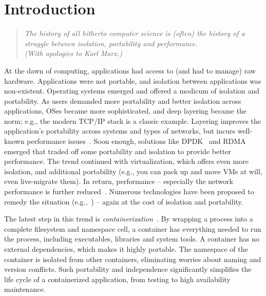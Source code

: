 \section{Introduction} 
\label{sec:introduction}

\begin{quote}
{\em 
The history of all hitherto computer science is (often) the history of a
struggle between isolation, portability and performance. \\ 
(With apologies to Karl Marx.)}
\end{quote}

At the dawn of computing, applications had access to (and had to manage) raw
hardware. Applications were not portable, and isolation between applications was
non-existent. Operating systems emerged and offered a modicum of isolation and
portability.  As users demanded more portability and better isolation across
applications, OSes became more sophisticated, and deep layering became the norm;
e.g., the modern TCP/IP stack is a classic example.  Layering improves the
application's portability across systems and types of  networks, but incurs
well-known performance issues~\cite{dcqcn,netmap}. Soon enough, solutions
like DPDK~\cite{dpdk} and RDMA~\cite{rdma} emerged that traded off some
portability and isolation to provide better performance.  The trend continued
with virtualization, which offers even more isolation, and additional
portability (e.g., you can pack up and move VMs at will, even live-migrate
them). In return, performance -- especially the network performance is further
reduced~\cite{netvm}. Numerous technologies have been proposed to remedy the
situation (e.g.,~\cite{sriov,netvm,netmap,dpdk}) -- again at the cost of
isolation and portability.

The latest step in this trend is {\em containerization}~\cite{docker,kubernetes,coreos}.  By wrapping
a process into a complete filesystem and namespace cell, a container has
everything needed to run the process, including executables, libraries and
system tools.  A container has no external dependencies, which makes it highly
portable. The namespace of the container is isolated from other containers,
eliminating worries about naming and version conflicts.  Such portability and
independence significantly simplifies the life cycle of a containerized
application, from testing to high availability maintenance. 

